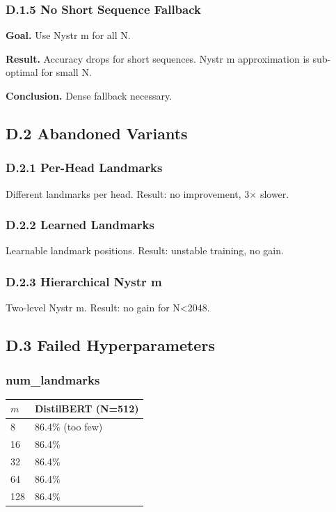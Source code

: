 \subsubsection{D.1.5 No Short Sequence Fallback}

\textbf{Goal.} Use Nystr m for all N.

\textbf{Result.} Accuracy drops for short sequences. Nystr m approximation is 
sub-optimal for small N.

\textbf{Conclusion.} Dense fallback necessary.

\subsection{D.2 Abandoned Variants}

\subsubsection{D.2.1 Per-Head Landmarks}

Different landmarks per head. Result: no improvement, 3$\times$ slower.

\subsubsection{D.2.2 Learned Landmarks}

Learnable landmark positions. Result: unstable training, no gain.

\subsubsection{D.2.3 Hierarchical Nystr m}

Two-level Nystr m. Result: no gain for N<2048.

\subsection{D.3 Failed Hyperparameters}

\subsubsection{num\_landmarks}

\begin{table}[H]
\centering
\small
\begin{tabular}{ll}
\toprule
\textbf{$m$} & \textbf{DistilBERT (N=512)} \\
\midrule
8 & 86.4\% (too few) \\
16 & 86.4\% \\
32 & 86.4\% \\
64 & 86.4\% \\
128 & 86.4\% \\
\bottomrule
\end{tabular}
\end{table}

